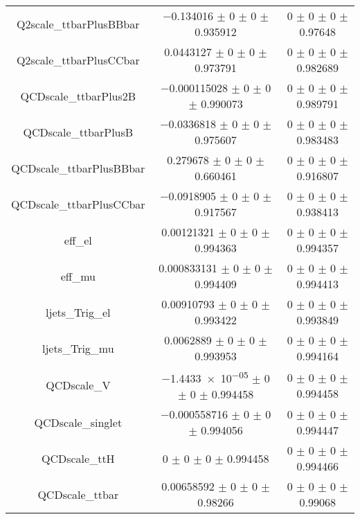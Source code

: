 \begin{table}
\begin{tabular}{ccc}
Q2scale\_ttbarPlusBBbar & \num{-0.134016} $\pm$ \num{0} $\pm$ \num{0} $\pm$ \num{0.935912} & \num{0} $\pm$ \num{0} $\pm$ \num{0} $\pm$ \num{0.97648}\\
Q2scale\_ttbarPlusCCbar & \num{0.0443127} $\pm$ \num{0} $\pm$ \num{0} $\pm$ \num{0.973791} & \num{0} $\pm$ \num{0} $\pm$ \num{0} $\pm$ \num{0.982689}\\
QCDscale\_ttbarPlus2B & \num{-0.000115028} $\pm$ \num{0} $\pm$ \num{0} $\pm$ \num{0.990073} & \num{0} $\pm$ \num{0} $\pm$ \num{0} $\pm$ \num{0.989791}\\
QCDscale\_ttbarPlusB & \num{-0.0336818} $\pm$ \num{0} $\pm$ \num{0} $\pm$ \num{0.975607} & \num{0} $\pm$ \num{0} $\pm$ \num{0} $\pm$ \num{0.983483}\\
QCDscale\_ttbarPlusBBbar & \num{0.279678} $\pm$ \num{0} $\pm$ \num{0} $\pm$ \num{0.660461} & \num{0} $\pm$ \num{0} $\pm$ \num{0} $\pm$ \num{0.916807}\\
QCDscale\_ttbarPlusCCbar & \num{-0.0918905} $\pm$ \num{0} $\pm$ \num{0} $\pm$ \num{0.917567} & \num{0} $\pm$ \num{0} $\pm$ \num{0} $\pm$ \num{0.938413}\\
eff\_el & \num{0.00121321} $\pm$ \num{0} $\pm$ \num{0} $\pm$ \num{0.994363} & \num{0} $\pm$ \num{0} $\pm$ \num{0} $\pm$ \num{0.994357}\\
eff\_mu & \num{0.000833131} $\pm$ \num{0} $\pm$ \num{0} $\pm$ \num{0.994409} & \num{0} $\pm$ \num{0} $\pm$ \num{0} $\pm$ \num{0.994413}\\
ljets\_Trig\_el & \num{0.00910793} $\pm$ \num{0} $\pm$ \num{0} $\pm$ \num{0.993422} & \num{0} $\pm$ \num{0} $\pm$ \num{0} $\pm$ \num{0.993849}\\
ljets\_Trig\_mu & \num{0.0062889} $\pm$ \num{0} $\pm$ \num{0} $\pm$ \num{0.993953} & \num{0} $\pm$ \num{0} $\pm$ \num{0} $\pm$ \num{0.994164}\\
QCDscale\_V & \num{-1.4433e-05} $\pm$ \num{0} $\pm$ \num{0} $\pm$ \num{0.994458} & \num{0} $\pm$ \num{0} $\pm$ \num{0} $\pm$ \num{0.994458}\\
QCDscale\_singlet & \num{-0.000558716} $\pm$ \num{0} $\pm$ \num{0} $\pm$ \num{0.994056} & \num{0} $\pm$ \num{0} $\pm$ \num{0} $\pm$ \num{0.994447}\\
QCDscale\_ttH & \num{0} $\pm$ \num{0} $\pm$ \num{0} $\pm$ \num{0.994458} & \num{0} $\pm$ \num{0} $\pm$ \num{0} $\pm$ \num{0.994466}\\
QCDscale\_ttbar & \num{0.00658592} $\pm$ \num{0} $\pm$ \num{0} $\pm$ \num{0.98266} & \num{0} $\pm$ \num{0} $\pm$ \num{0} $\pm$ \num{0.99068}\\

\end{tabular}
\end{table}
